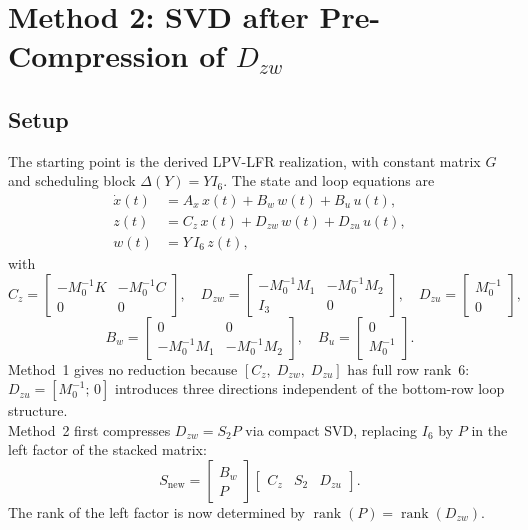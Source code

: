 \documentclass[11pt]{article}
\newcommand{\rank}{\operatorname{rank}}
\begin{document}
\newpage
\section{Method 2: SVD after Pre-Compression of $D_{zw}$}

\subsection{Setup}
The starting point is the derived LPV-LFR realization, with constant matrix $G$ and scheduling block $\Delta(Y) = Y I_6$. The state and loop equations are
\begin{align}
    \dot{x}(t) &= A_x\, x(t) + B_w\, w(t) + B_u\, u(t), 
    \label{eq:state2} \\
    z(t) &= C_z\, x(t) + D_{zw}\, w(t) + D_{zu}\, u(t),
    \label{eq:loopz2} \\
    w(t) &= Y\, I_6\, z(t),
    \label{eq:loopw2}
\end{align}
with
\begin{equation}
    C_z =
    \begin{bmatrix}
        -M_0^{-1}K & -M_0^{-1}C \\
        0 & 0
    \end{bmatrix},
    \quad
    D_{zw} =
    \begin{bmatrix}
        -M_0^{-1}M_1 & -M_0^{-1}M_2 \\
        I_3 & 0
    \end{bmatrix},
    \quad
    D_{zu} =
    \begin{bmatrix}
        M_0^{-1} \\
        0
    \end{bmatrix},
    \label{eq:method2CD}
\end{equation}
\begin{equation}
    B_w =
    \begin{bmatrix}
        0 & 0 \\
        -M_0^{-1}M_1 & -M_0^{-1}M_2
    \end{bmatrix},
    \quad
    B_u =
    \begin{bmatrix}
        0 \\ M_0^{-1}
    \end{bmatrix}.
    \label{eq:method2B}
\end{equation}
Method~1 gives no reduction because $[C_z,\; D_{zw},\; D_{zu}]$ has full 
row rank~$6$: $D_{zu} = [M_0^{-1};\, 0]$ introduces three directions 
independent of the bottom-row loop structure.
\\
Method~2 first compresses $D_{zw} = S_2 P$ via compact SVD, replacing $I_6$ 
by $P$ in the left factor of the stacked matrix:
\[
    S_{\mathrm{new}} =
    \begin{bmatrix} B_w \\[2pt] P \end{bmatrix}
    \begin{bmatrix} C_z & S_2 & D_{zu} \end{bmatrix}.
\]
The rank of the left factor is now determined by $\rank(P) = \rank(D_{zw})$.
\end{document}
